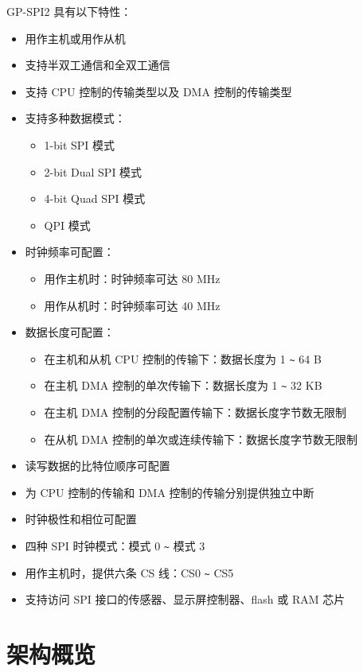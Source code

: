 \documentclass[main\_\_CN.tex]{subfiles}
\begin{document}
GP-SPI2 具有以下特性：
\begin{itemize}
    \item 用作主机或用作从机
    \item 支持半双工通信和全双工通信
    \item 支持 CPU 控制的传输类型以及 DMA 控制的传输类型
    \item 支持多种数据模式：
        \begin{itemize}
            \item 1-bit SPI 模式
            \item 2-bit Dual SPI 模式
            \item 4-bit Quad SPI 模式
            \item QPI 模式
        \end{itemize}
    \item 时钟频率可配置：
        \begin{itemize}
        \item 用作主机时：时钟频率可达 80 MHz
            \item 用作从机时：时钟频率可达 40 MHz 
        \end{itemize}
    \item 数据长度可配置：
    \begin{itemize}
        \item 在主机和从机 CPU 控制的传输下：数据长度为 1 \verb+~+ 64 B
        \item 在主机 DMA 控制的单次传输下：数据长度为 1 \verb+~+ 32 KB
        \item 在主机 DMA 控制的分段配置传输下：数据长度字节数无限制
        \item 在从机 DMA 控制的单次或连续传输下：数据长度字节数无限制
    \end{itemize}
    \item 读写数据的比特位顺序可配置
    \item 为 CPU 控制的传输和 DMA 控制的传输分别提供独立中断 
    \item 时钟极性和相位可配置
    \item 四种 SPI 时钟模式：模式 0 \verb+~+ 模式 3
    \item 用作主机时，提供六条 CS 线：CS0 \verb+~+ CS5
    \item 支持访问 SPI 接口的传感器、显示屏控制器、flash 或 RAM 芯片
\end{itemize}

\section{架构概览}
\end{document}
